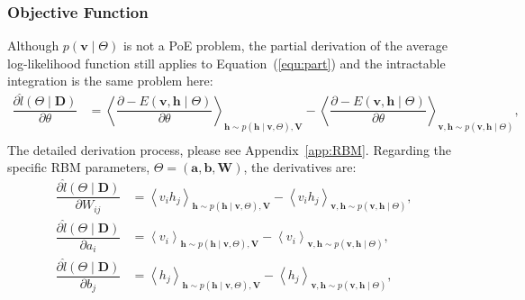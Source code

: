 \subsubsection{Objective Function}
Although $ p(\mathbf{v} \mid \Theta) $ is not a PoE problem, the partial derivation of the average log-likelihood function still applies to Equation~(\ref{equ:part}) and the intractable integration is the same problem here:
\begin{equation}
\label{equ:RBM}
\begin{aligned}
\dfrac{\partial \hat{l} (\Theta \mid \mathbf{D})}{\partial \theta} 
& = \left \langle \dfrac{\partial -E(\mathbf{v}, \mathbf{h} \mid \Theta)}{\partial \theta} \right \rangle_{\mathbf{h} \sim p( \mathbf{h} \mid \mathbf{v}, \Theta), \mathbf{V}} 
- \left \langle \dfrac{\partial -E(\mathbf{v}, \mathbf{h} \mid \Theta)}{\partial \theta} \right \rangle_{\mathbf{v}, \mathbf{h} \sim p( \mathbf{v}, \mathbf{h} \mid  \Theta)},  \\
\end{aligned}
\end{equation}
The detailed derivation process, please see Appendix~\ref{app:RBM}.
Regarding the specific RBM parameters,  $ \Theta = (\mathbf{a}, \mathbf{b}, \mathbf{W}) $, the derivatives are:
\begin{equation}
\label{equ:RBM_2}
\begin{aligned}
\dfrac{\partial \hat{l} (\Theta \mid \mathbf{D})}{\partial W_{ij}} 
& = \left \langle v_i h_j \right \rangle_{\mathbf{h} \sim p( \mathbf{h} \mid \mathbf{v}, \Theta), \mathbf{V}} 
- \left \langle  v_i h_j \right \rangle_{\mathbf{v}, \mathbf{h} \sim p( \mathbf{v}, \mathbf{h} \mid  \Theta)},  \\
\dfrac{\partial \hat{l} (\Theta \mid \mathbf{D})}{\partial a_{i}} 
& = \left \langle v_i \right \rangle_{\mathbf{h} \sim p( \mathbf{h} \mid \mathbf{v}, \Theta), \mathbf{V}} 
- \left \langle  v_i \right \rangle_{\mathbf{v}, \mathbf{h} \sim p( \mathbf{v}, \mathbf{h} \mid  \Theta)},  \\
\dfrac{\partial \hat{l} (\Theta \mid \mathbf{D})}{\partial b_{j}} 
& = \left \langle h_j \right \rangle_{\mathbf{h} \sim p( \mathbf{h} \mid \mathbf{v}, \Theta), \mathbf{V}} 
- \left \langle  h_j \right \rangle_{\mathbf{v}, \mathbf{h} \sim p( \mathbf{v}, \mathbf{h} \mid  \Theta)},  \\
\end{aligned}
\end{equation}

